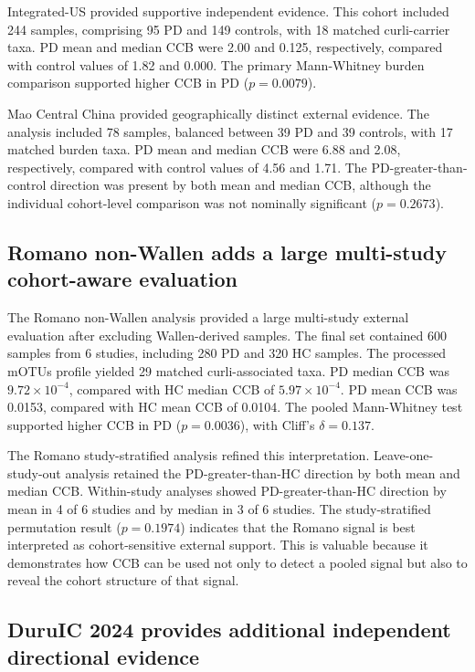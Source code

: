 \documentclass[11pt]{article}
\begin{document}
Integrated-US provided supportive independent evidence. This cohort included 244 samples, comprising 95 PD and 149 controls, with 18 matched curli-carrier taxa. PD mean and median CCB were 2.00 and 0.125, respectively, compared with control values of 1.82 and 0.000. The primary Mann-Whitney burden comparison supported higher CCB in PD ($p=0.0079$).

Mao Central China provided geographically distinct external evidence. The analysis included 78 samples, balanced between 39 PD and 39 controls, with 17 matched burden taxa. PD mean and median CCB were 6.88 and 2.08, respectively, compared with control values of 4.56 and 1.71. The PD-greater-than-control direction was present by both mean and median CCB, although the individual cohort-level comparison was not nominally significant ($p=0.2673$).

\subsection*{Romano non-Wallen adds a large multi-study cohort-aware evaluation}

The Romano non-Wallen analysis provided a large multi-study external evaluation after excluding Wallen-derived samples. The final set contained 600 samples from 6 studies, including 280 PD and 320 HC samples. The processed mOTUs profile yielded 29 matched curli-associated taxa. PD median CCB was $9.72\times10^{-4}$, compared with HC median CCB of $5.97\times10^{-4}$. PD mean CCB was 0.0153, compared with HC mean CCB of 0.0104. The pooled Mann-Whitney test supported higher CCB in PD ($p=0.0036$), with Cliff's $\delta=0.137$.

The Romano study-stratified analysis refined this interpretation. Leave-one-study-out analysis retained the PD-greater-than-HC direction by both mean and median CCB. Within-study analyses showed PD-greater-than-HC direction by mean in 4 of 6 studies and by median in 3 of 6 studies. The study-stratified permutation result ($p=0.1974$) indicates that the Romano signal is best interpreted as cohort-sensitive external support. This is valuable because it demonstrates how CCB can be used not only to detect a pooled signal but also to reveal the cohort structure of that signal.

\subsection*{DuruIC 2024 provides additional independent directional evidence}
\end{document}
